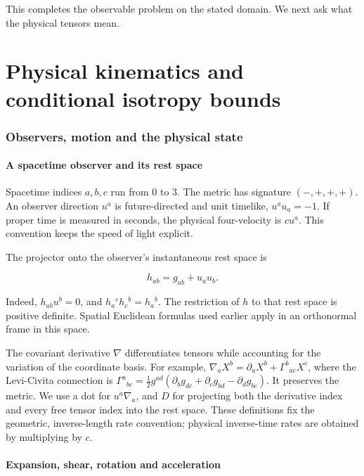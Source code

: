 \documentclass[
  11pt,
  a4paper]{article}
\begin{document}
This completes the observable problem on the stated domain. We next ask what the physical tensors mean.

\clearpage
\part{Physical kinematics and conditional isotropy bounds}

\hypertarget{observers-motion-and-the-physical-state}{%
\section{Observers, motion and the physical state}\label{observers-motion-and-the-physical-state}}

\hypertarget{a-spacetime-observer-and-its-rest-space}{%
\subsection{A spacetime observer and its rest space}\label{a-spacetime-observer-and-its-rest-space}}

Spacetime indices \(a,b,c\) run from 0 to 3. The metric has signature \((-,+,+,+)\). An observer direction \(u^a\) is future-directed and unit timelike, \(u^au_a=-1\). If proper time is measured in seconds, the physical four-velocity is \(cu^a\). This convention keeps the speed of light explicit.

The projector onto the observer's instantaneous rest space is

\[
h_{ab}=g_{ab}+u_au_b.
\tag{5.1}
\]

Indeed, \(h_{ab}u^b=0\), and \(h_a{}^ch_c{}^b=h_a{}^b\). The restriction of \(h\) to that rest space is positive definite. Spatial Euclidean formulas used earlier apply in an orthonormal frame in this space.

The covariant derivative \(\nabla\) differentiates tensors while accounting for the variation of the coordinate basis. For example,
\(\nabla_aX^b=\partial_aX^b+\Gamma^b{}_{ac}X^c\), where the Levi-Civita connection is
\(\Gamma^a{}_{bc}=\tfrac12g^{ad}(\partial_bg_{dc}+\partial_cg_{bd}-\partial_dg_{bc})\).
It preserves the metric. We use a dot for \(u^a\nabla_a\), and \(D\) for projecting both the derivative index and every free tensor index into the rest space. These definitions fix the geometric, inverse-length rate convention; physical inverse-time rates are obtained by multiplying by \(c\).

\hypertarget{expansion-shear-rotation-and-acceleration}{%
\subsection{Expansion, shear, rotation and acceleration}\label{expansion-shear-rotation-and-acceleration}}
\end{document}

